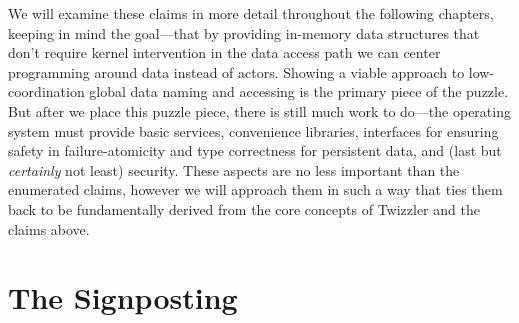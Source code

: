 We will examine these claims in more detail throughout the following chapters, keeping in mind the goal---that by
providing in-memory data structures that don't require kernel intervention in the data access path we can center
programming around data instead of actors. Showing a viable approach to low-coordination global data naming and
accessing is the primary piece of the puzzle. But after we place this puzzle piece, there is still much work to do---the
operating system must provide basic services, convenience libraries, interfaces for ensuring safety in
failure-atomicity and type correctness for persistent data, and (last but \emph{certainly} not least) security. These
aspects are no less important than the enumerated claims, however we will approach them in such a way that ties
them back to be fundamentally derived from the core concepts of Twizzler and the claims above.

\section*{The Signposting}

